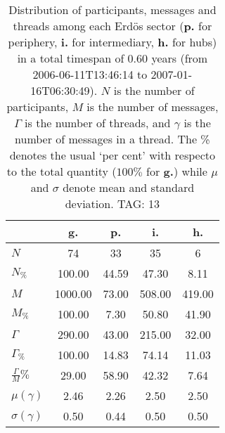 \begin{table}[h!]
\begin{center}
\begin{tabular}{| l | c | c | c | c |}\hline
 & g. & p. & i. & h. \\\hline
$N$ & 74  & 33  & 35  & 6 \\\hline
$N_{\%}$ & 100.00  & 44.59  & 47.30  & 8.11 \\\hline
$M$ & 1000.00  & 73.00  & 508.00  & 419.00 \\\hline
$M_{\%}$ & 100.00  & 7.30  & 50.80  & 41.90 \\\hline
$\Gamma$ & 290.00  & 43.00  & 215.00  & 32.00 \\\hline
$\Gamma_{\%}$ & 100.00  & 14.83  & 74.14  & 11.03 \\\hline
$\frac{\Gamma}{M}\%$ & 29.00  & 58.90  & 42.32  & 7.64 \\\hline
$\mu(\gamma)$ & 2.46  & 2.26  & 2.50  & 2.50 \\\hline
$\sigma(\gamma)$ & 0.50  & 0.44  & 0.50  & 0.50 \\\hline
\end{tabular}
\caption{Distribution of participants, messages and threads among each Erd\"os sector ({\bf p.} for periphery, {\bf i.} for intermediary, 
    {\bf h.} for hubs) in a total timespan of 0.60 years (from 2006-06-11T13:46:14 to 2007-01-16T06:30:49). $N$ is the number of participants, $M$ is the number of messages, $\Gamma$ is the number of threads, and $\gamma$ is the number of messages in a thread.
    The \% denotes the usual `per cent' with respecto to the total quantity ($100\%$ for {\bf g.})
    while $\mu$ and $\sigma$ denote mean and standard deviation. TAG: 13}
\end{center}
\end{table}